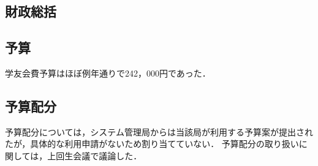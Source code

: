 \subsection*{財政総括}


\subsection*{予算}
学友会費予算はほぼ例年通りで242，000円であった．

\subsection*{予算配分}
予算配分については，システム管理局からは当該局が利用する予算案が提出されたが，具体的な利用申請がないため割り当てていない．
予算配分の取り扱いに関しては，上回生会議で議論した．
